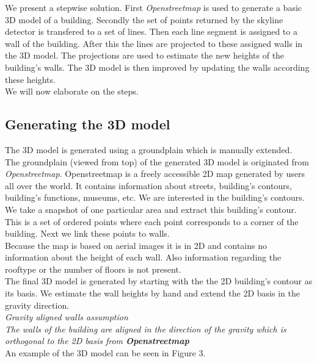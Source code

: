 \documentclass[10pt]{article}
\begin{document}
We present a stepwise solution. First \emph{Openstreetmap} is used to generate
a basic 3D model of a building. Secondly the set of points returned by the
skyline detector is transfered to a set of lines. Then each line segment is
assigned to a wall of the building. After this the lines are projected to these
assigned walls in the 3D model. 
The projections are used to estimate the new heights of the building's walls.
The 3D model is then improved by updating the walls according these heights. \\
We will now elaborate on the steps.

\subsection{Generating the 3D model}
The 3D model is generated using a groundplain which is manually extended.\\
The groundplain (viewed from top) of the generated 3D model is originated from
\emph{Openstreetmap}.  Openstreetmap is a freely accessible 2D map generated by
users all over the world. It contains information about streets, building's
contours, building's functions, museums, etc.  We are interested in the building's
contours.  We take a snapshot of one particular area and extract this building's
contour.  This is a set of ordered points where each point corresponds to a
corner of the building.  Next we link these points to walls.\\ 
Because the map is based on aerial images it is in 2D and contains no
information about the height of each wall.  Also information regarding the
rooftype or the number of floors is not present.\\
The final 3D model is generated by starting with the the 2D building's contour as
its basis. We estimate the wall heights by hand and extend the
2D basis in the gravity direction.\\
\emph{Gravity aligned walls assumption}\\
	\emph{The walls of the building are aligned in the direction of the gravity
	which is orthogonal to the 2D basis from \textbf{Openstreetmap}}\\

An example of the 3D model can be seen in Figure 3.\\
\end{document}
